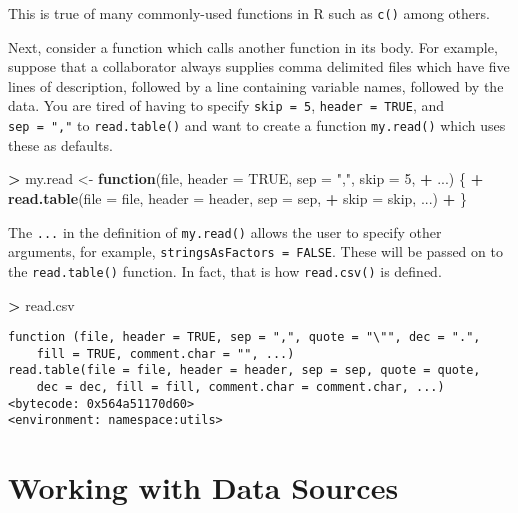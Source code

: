 \documentclass[]{krantz}
\makeatletter
\newenvironment{Shaded}{\begin{snugshade}}{\end{snugshade}}
\newcommand{\KeywordTok}[1]{\textcolor[rgb]{0.27,0.27,0.27}{\textbf{#1}}}
\newcommand{\DataTypeTok}[1]{\textcolor[rgb]{0.27,0.27,0.27}{#1}}
\newcommand{\DecValTok}[1]{\textcolor[rgb]{0.06,0.06,0.06}{#1}}
\newcommand{\StringTok}[1]{\textcolor[rgb]{0.5,0.5,0.5}{#1}}
\newcommand{\OtherTok}[1]{\textcolor[rgb]{0.37,0.37,0.37}{#1}}
\newcommand{\ControlFlowTok}[1]{\textcolor[rgb]{0.27,0.27,0.27}{\textbf{#1}}}
\newcommand{\OperatorTok}[1]{\textcolor[rgb]{0.43,0.43,0.43}{\textbf{#1}}}
\newcommand{\NormalTok}[1]{#1}
\newenvironment{kframe}{%
\medskip{}
\setlength{\fboxsep}{.8em}
 \def\at@end@of@kframe{}%
 \ifinner\ifhmode%
  \def\at@end@of@kframe{\end{minipage}}%
  \begin{minipage}{\columnwidth}%
 \fi\fi%
 \def\FrameCommand##1{\hskip\@totalleftmargin \hskip-\fboxsep
 \colorbox{shadecolor}{##1}\hskip-\fboxsep
     \hskip-\linewidth \hskip-\@totalleftmargin \hskip\columnwidth}%
 \MakeFramed {\advance\hsize-\width
   \@totalleftmargin\z@ \linewidth\hsize
   \@setminipage}}%
 {\par\unskip\endMakeFramed%
 \at@end@of@kframe}
\renewenvironment{Shaded}{\begin{kframe}}{\end{kframe}}
\theoremstyle{definition}
\theoremstyle{definition}
\theoremstyle{definition}
\theoremstyle{remark}
\makeatother
\begin{document}
This is true of many commonly-used functions in R such as \texttt{c()}
among others.

Next, consider a function which calls another function in its body. For
example, suppose that a collaborator always supplies comma delimited
files which have five lines of description, followed by a line
containing variable names, followed by the data. You are tired of having
to specify \texttt{skip\ =\ 5}, \texttt{header\ =\ TRUE}, and
\texttt{sep\ =\ ","} to \texttt{read.table()} and want to create a
function \texttt{my.read()} which uses these as defaults.

\begin{Shaded}
\begin{Highlighting}[]
\OperatorTok{>}\StringTok{ }\NormalTok{my.read <-}\StringTok{ }\ControlFlowTok{function}\NormalTok{(file, }\DataTypeTok{header =} \OtherTok{TRUE}\NormalTok{, }\DataTypeTok{sep =} \StringTok{","}\NormalTok{, }\DataTypeTok{skip =} \DecValTok{5}\NormalTok{, }
\OperatorTok{+}\StringTok{   }\NormalTok{...) \{}
\OperatorTok{+}\StringTok{   }\KeywordTok{read.table}\NormalTok{(}\DataTypeTok{file =}\NormalTok{ file, }\DataTypeTok{header =}\NormalTok{ header, }\DataTypeTok{sep =}\NormalTok{ sep, }
\OperatorTok{+}\StringTok{     }\DataTypeTok{skip =}\NormalTok{ skip, ...)}
\OperatorTok{+}\StringTok{ }\NormalTok{\}}
\end{Highlighting}
\end{Shaded}

The \texttt{...} in the definition of \texttt{my.read()} allows the user
to specify other arguments, for example,
\texttt{stringsAsFactors\ =\ FALSE}. These will be passed on to the
\texttt{read.table()} function. In fact, that is how \texttt{read.csv()}
is defined.

\begin{Shaded}
\begin{Highlighting}[]
\OperatorTok{>}\StringTok{ }\NormalTok{read.csv}
\end{Highlighting}
\end{Shaded}

\begin{verbatim}
function (file, header = TRUE, sep = ",", quote = "\"", dec = ".", 
    fill = TRUE, comment.char = "", ...) 
read.table(file = file, header = header, sep = sep, quote = quote, 
    dec = dec, fill = fill, comment.char = comment.char, ...)
<bytecode: 0x564a51170d60>
<environment: namespace:utils>
\end{verbatim}

\chapter{Working with Data Sources}\label{working-with-data-sources}
\end{document}
